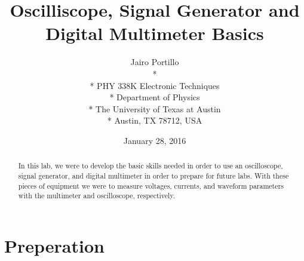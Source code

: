 \documentclass[11pt,letterpaper,onecolumn]{article}
\begin{document}

\title{\bf Oscilliscope, Signal Generator and Digital Multimeter Basics}

\author{
 Jairo Portillo \\*
  \\*
 PHY 338K Electronic Techniques \\*
 Department of Physics \\*
 The University of Texas at Austin \\*
 Austin, TX 78712, USA
}
\date{January 28, 2016}


\maketitle


\begin{abstract}

In this lab, we were to develop the basic skills needed in order to use an oscilloscope, signal generator, and digital multimeter in order to prepare for future labs. With these pieces of equipment we were to measure voltages, currents, and waveform parameters with the multimeter and oscilloscope, respectively.   
\end{abstract}



\section{Preperation}
\end{document}
